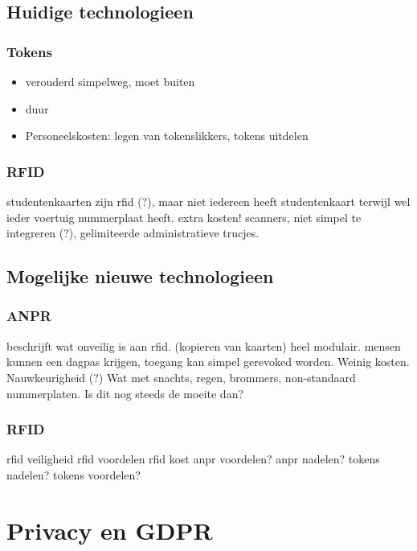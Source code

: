 \subsection{Huidige technologieen}

\subsubsection{Tokens}
\begin{itemize}
	\item verouderd simpelweg, moet buiten
	\item duur
	\item Personeelskosten: legen van tokenslikkers, tokens uitdelen
\end{itemize}

\subsubsection{RFID}
studentenkaarten zijn rfid (?), maar niet iedereen heeft studentenkaart terwijl wel ieder voertuig nummerplaat heeft.
extra kosten! scanners, niet simpel te integreren (?), gelimiteerde administratieve trucjes.

\subsection{Mogelijke nieuwe technologieen}

\subsubsection{ANPR}
	\textcite{aalsalem2015automated} beschrijft wat onveilig is aan rfid. (kopieren van kaarten)
	heel modulair. mensen kunnen een dagpas krijgen, toegang kan simpel gerevoked worden. Weinig kosten. Nauwkeurigheid (?)
	Wat met snachts, regen, brommers, non-standaard nummerplaten. Is dit nog steeds de moeite dan?

\subsubsection{RFID}

rfid veiligheid
rfid voordelen
rfid kost
anpr voordelen?
anpr nadelen?
tokens nadelen?
tokens voordelen?
	
\section{Privacy en GDPR}
\label{sec:privacy-en-gdpr}


